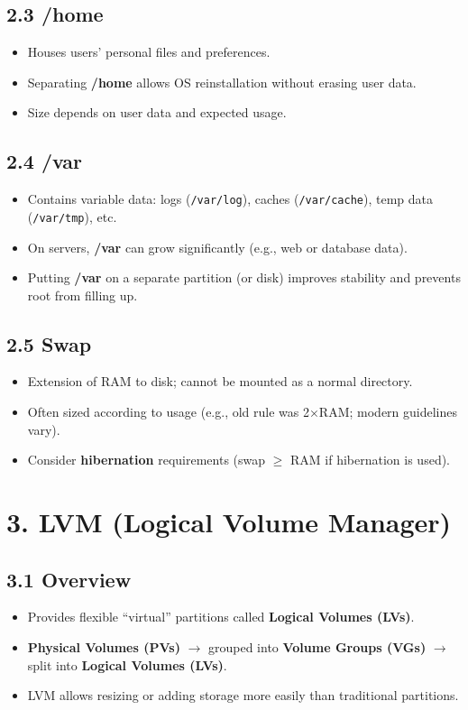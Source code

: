 \documentclass[12pt,a4paper]{report}
\begin{document}
\subsection*{2.3 /home}
\begin{itemize}
    \item Houses users’ personal files and preferences.  
    \item Separating \textbf{/home} allows OS reinstallation without erasing user data.  
    \item Size depends on user data and expected usage.
\end{itemize}

\subsection*{2.4 /var}
\begin{itemize}
    \item Contains variable data: logs (\texttt{/var/log}), caches (\texttt{/var/cache}), temp data (\texttt{/var/tmp}), etc.  
    \item On servers, \textbf{/var} can grow significantly (e.g., web or database data).  
    \item Putting \textbf{/var} on a separate partition (or disk) improves stability and prevents root from filling up.
\end{itemize}

\subsection*{2.5 Swap}
\begin{itemize}
    \item Extension of RAM to disk; cannot be mounted as a normal directory.  
    \item Often sized according to usage (e.g., old rule was 2×RAM; modern guidelines vary).  
    \item Consider \textbf{hibernation} requirements (swap $\geq$ RAM if hibernation is used).
\end{itemize}



\section*{3. LVM (Logical Volume Manager)}

\subsection*{3.1 Overview}
\begin{itemize}
    \item Provides flexible “virtual” partitions called \textbf{Logical Volumes (LVs)}.  
    \item \textbf{Physical Volumes (PVs)} $\rightarrow$ grouped into \textbf{Volume Groups (VGs)} $\rightarrow$ split into \textbf{Logical Volumes (LVs)}.  
    \item LVM allows resizing or adding storage more easily than traditional partitions.
\end{itemize}
\end{document}
